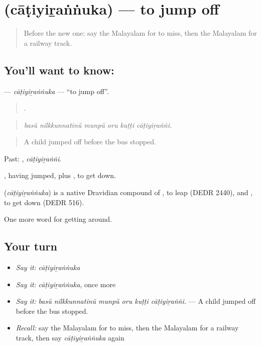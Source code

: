 \section[\texorpdfstring{\ml{ചാടിയിറങ്ങുക} (cāṭiyiṟaṅṅuka)}{ചാടിയിറങ്ങുക (cāṭiyiṟaṅṅuka)}]{ (cāṭiyiṟaṅṅuka) — to jump off}

\label{lesson:ML-C474-catiyirannuka}



\begin{quote}
Before the new one: say the Malayalam for to miss, then the Malayalam for a railway track.
\end{quote}

\subsection*{You'll want to know: }
\textbf{} — \emph{cāṭiyiṟaṅṅuka} — \textquotedblleft{}to jump off\textquotedblright{}.

\begin{quote}
     .
\end{quote}

\begin{quote}
\emph{basŭ nilkkunnatinŭ munpŭ oru kuṭṭi cāṭiyiṟaṅṅi.}
\end{quote}

\begin{quote}
A child jumped off before the bus stopped.
\end{quote}

Past: , \emph{cāṭiyiṟaṅṅi}.

, having jumped, plus , to get down.

\begin{cousinweb}
\textbf{} (\emph{cāṭiyiṟaṅṅuka}) is a native Dravidian compound of , to leap (DEDR 2440), and , to get down (DEDR 516).
\end{cousinweb}

\begin{grammarlens}[title={What you've built}]
One more word for getting around.
\end{grammarlens}

\subsection*{Your turn}
\begin{itemize}
\raggedright
  \item \emph{Say it:} \emph{cāṭiyiṟaṅṅuka}
  \item \emph{Say it:} \emph{cāṭiyiṟaṅṅuka}, once more
  \item \emph{Say it:} \emph{basŭ nilkkunnatinŭ munpŭ oru kuṭṭi cāṭiyiṟaṅṅi.} — A child jumped off before the bus stopped.
  \item \emph{Recall:} say the Malayalam for to miss, then the Malayalam for a railway track, then say \emph{cāṭiyiṟaṅṅuka} again
\end{itemize}

